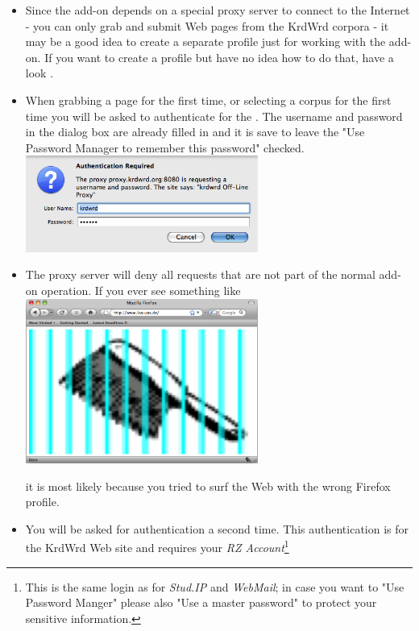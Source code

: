\documentclass[12pt]{article}
\begin{document}
\begin{itemize}
\item Since the add-on depends on a special proxy server to connect to the Internet - you can only grab and submit Web pages from the KrdWrd corpora - it may be a good idea to create a separate profile just for working with the add-on. If you want to create a profile but have no idea how to do that, have a look . \\
\item When grabbing a page for the first time, or selecting a corpus for the first time you will be asked to authenticate for the . The username and password in the dialog box are already filled in and it is save to leave the "Use Password Manager to remember this password" checked. \\

\includegraphics[width=0.6\textwidth]{images/prxylogin.png}
\medskip

\item The proxy server will deny all requests that are not part of the normal add-on operation. If you ever see something like \\

\includegraphics[width=0.6\textwidth]{images/blocked.png}
\medskip

it is most likely because you tried to surf the Web with the wrong Firefox profile. \\

\item You will be asked for authentication a second time. This authentication is for the KrdWrd Web site and requires your \emph{RZ Account}\footnote{This is the same login as for \emph{Stud.IP} and \emph{WebMail}; in case you want to "Use Password Manger" please also "Use a master password" to protect your sensitive information.} \\


\end{itemize}
\end{document}

